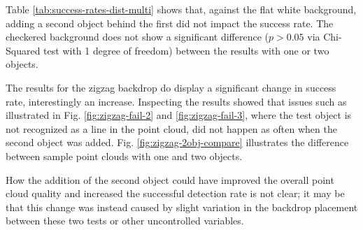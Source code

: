 Table \ref{tab:success-rates-dist-multi} shows that, against the flat white background, adding a second object behind the first did not
impact the success rate. The checkered background does not show a significant difference ($p>0.05$ via Chi-Squared test with 1 degree of freedom)
between the results with one or two objects. 

The results for the zigzag backdrop do display a significant change in success rate, interestingly an increase. 
Inspecting the results showed that issues such as illustrated in Fig. \ref{fig:zigzag-fail-2} and \ref{fig:zigzag-fail-3},
where the test object is not recognized as a line in the point cloud, did not happen as often when the second object was added.
Fig. \ref{fig:zigzag-2obj-compare} illustrates the difference between sample point clouds with one and two objects. 

How the addition of the second object could have improved the overall point cloud quality and increased the successful 
detection rate is not clear; it may be that this change was instead caused by slight variation in the backdrop placement
between these two tests or other uncontrolled variables.


